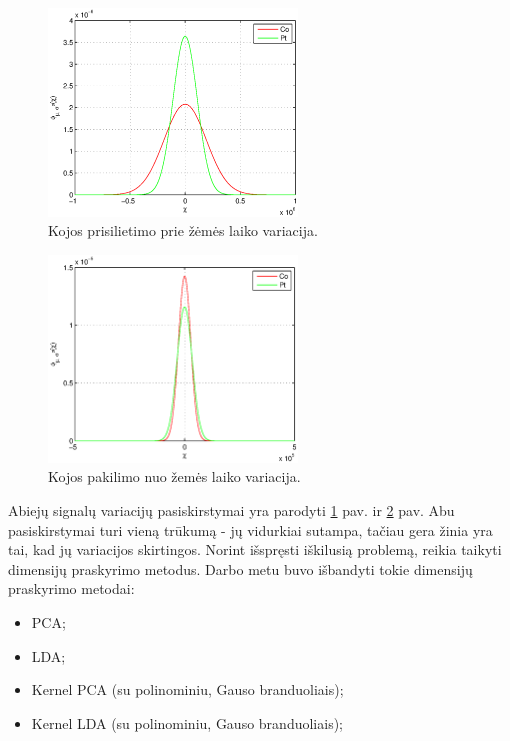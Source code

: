 \documentclass[]{vgtuef}
\begin{document}
\begin{figure}[!t]
  \centering
  \includegraphics[width=250px]{figures/stance_phase.eps}
  \caption{Kojos prisilietimo prie žėmės laiko variacija.}
  \label{fig:stance_var}
\end{figure}

\begin{figure}[!t]
  \centering
  \includegraphics[width=250px]{figures/swing_phase.eps}
  \caption{Kojos pakilimo nuo žemės laiko variacija.}
  \label{fig:swing_var}
\end{figure}

Abiejų signalų variacijų pasiskirstymai yra parodyti \ref{fig:stance_var} pav. ir \ref{fig:swing_var} pav. Abu pasiskirstymai turi vieną trūkumą - jų vidurkiai sutampa, tačiau gera žinia yra tai, kad jų variacijos skirtingos. Norint išspręsti iškilusią problemą, reikia taikyti dimensijų praskyrimo metodus. Darbo metu buvo išbandyti tokie dimensijų praskyrimo metodai:

\begin{itemize}
\item PCA;
\item LDA;
\item Kernel PCA (su polinominiu, Gauso branduoliais);
\item Kernel LDA (su polinominiu, Gauso branduoliais);
\end{itemize}
\end{document}
